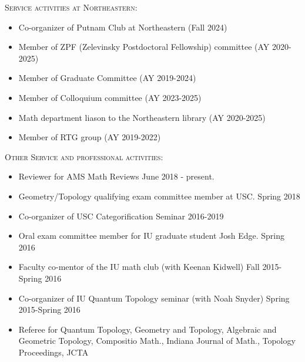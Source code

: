 \documentclass[12pt]{amsart}
\renewcommand{\j}{\indent}
\renewcommand{\v}{\vskip5pt }
\newcommand{\newitem}[1]{\noindent\textsc{#1:}\vskip5pt  }
\begin{document}
\begin{itemize}
\begin{itemize}
\end{itemize}

\newitem{Service activities at Northeastern}

\begin{itemize}\setlength{\itemsep}{5pt}

\item[$\cdot$] Co-organizer of Putnam Club at Northeastern (Fall 2024)

\item[$\cdot$] Member of ZPF (Zelevinsky Postdoctoral Fellowship) committee (AY 2020-2025)

\item[$\cdot$] Member of Graduate Committee (AY 2019-2024)

\item[$\cdot$] Member of Colloquium committee (AY 2023-2025)
\item[$\cdot$] Math department liason to the Northeastern library (AY 2020-2025)

\item[$\cdot$] Member of RTG group (AY 2019-2022)



\end{itemize}


\newitem{Other Service and professional activities}

\begin{itemize}
\item[$\cdot$] Reviewer for AMS Math Reviews \hfill June 2018 - present.\v

\item[$\cdot$] Geometry/Topology qualifying exam committee member at USC. \hfill Spring 2018\v

\item[$\cdot$]  Co-organizer of USC Categorification Seminar \hfill 2016-2019

\item[$\cdot$]Oral exam committee member for IU graduate student Josh Edge. \hfill Spring 2016\v



\item[$\cdot$] 	Faculty co-mentor of the IU math club (with Keenan Kidwell) \hfill Fall 2015-Spring 2016\v

\item[$\cdot$]Co-organizer of IU Quantum Topology seminar (with Noah Snyder) \hfill  Spring 2015-Spring 2016\v


\item[$\cdot$] Referee for  Quantum Topology, Geometry and Topology, Algebraic and Geometric Topology, Compositio Math., Indiana Journal of Math., Topology Proceedings, JCTA
\end{itemize}
\end{document}
